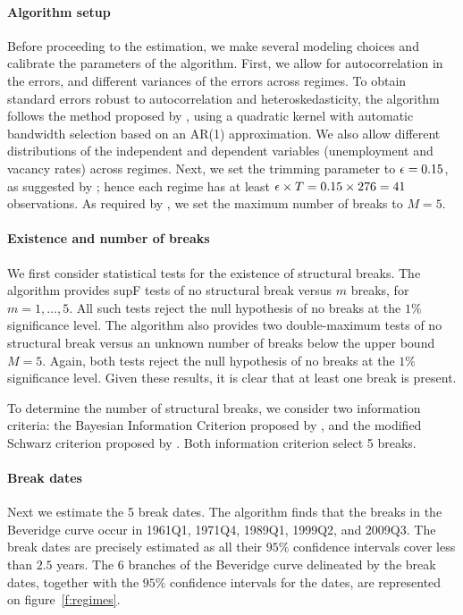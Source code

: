 \documentclass[letterpaper,12pt,leqno]{article}
\begin{document}
\paragraph{Algorithm setup} Before proceeding to the estimation, we make several modeling choices and calibrate the parameters of the algorithm. First,  we allow for autocorrelation in the errors, and different variances of the errors across regimes. To obtain standard errors robust to autocorrelation and heteroskedasticity, the algorithm follows the method proposed by , using a quadratic kernel with automatic bandwidth selection based on an AR(1) approximation. We also allow different distributions of the independent and dependent variables (unemployment and vacancy rates) across regimes. Next, we set the trimming parameter to $\epsilon=0.15$, as suggested by ; hence each regime has at least $\epsilon \times T = 0.15 \times 276 = 41$ observations. As required by , we set the maximum number of breaks to $M=5$.

\paragraph{Existence and number of breaks} We first consider statistical tests for the existence of structural breaks. The algorithm provides supF tests of no structural break versus $m$ breaks, for $m=1,\ldots,5$. All such tests reject the null hypothesis of no breaks at the $1\%$ significance level. The algorithm also provides two double-maximum tests of no structural break versus an unknown number of breaks below the upper bound $M=5$. Again, both tests reject the null hypothesis of no breaks at the $1\%$ significance level. Given these results, it is clear that at least one break is present.

To determine the number of structural breaks, we consider two information criteria: the Bayesian Information Criterion proposed by , and the modified Schwarz criterion proposed by . Both information criterion select 5 breaks. 

\paragraph{Break dates} Next we estimate the 5 break dates. The algorithm finds that the breaks in the Beveridge curve occur in 1961Q1, 1971Q4, 1989Q1, 1999Q2, and 2009Q3. The break dates are precisely estimated as all their $95\%$ confidence intervals cover less than $2.5$ years. The 6 branches of the Beveridge curve delineated by the break dates, together with the $95\%$ confidence intervals for the dates, are represented on figure~\ref{f:regimes}. 
\end{document}
